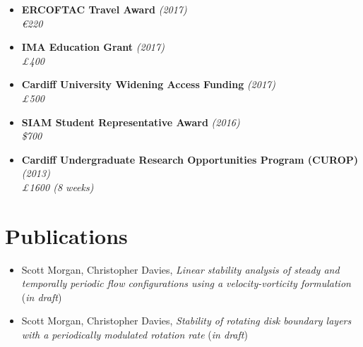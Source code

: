 \documentclass[10pt,a4paper,sans]{moderncv}        %
\begin{document}
\begin{itemize}
			\item \textbf{ERCOFTAC Travel Award} \hfill\textit{(2017)}\\
			\textit{\euro{}220}
			
			\vspace{2pt}
			
			\item \textbf{IMA Education Grant} \hfill\textit{(2017)}\\
			\textit{£400}
			
			\vspace{2pt}
			
			\item \textbf{Cardiff University Widening Access Funding} \hfill\textit{(2017)}\\
			\textit{£500}
			
			\vspace{2pt}
			
			\item \textbf{SIAM Student Representative Award} \hfill \textit{(2016)}\\
			\textit{\$700}
			
			\vspace{2pt}
			
			\item \textbf{Cardiff Undergraduate Research Opportunities Program (CUROP)} \hfill\textit{(2013)} \\
			\textit{£1600 (8 weeks)}
			
		\end{itemize}
	
	\section{Publications}
	
	\vspace{6pt}
	
	\begin{itemize}
		\item Scott Morgan, Christopher Davies, \textit{Linear stability analysis of steady and temporally periodic flow configurations using a velocity-vorticity formulation} (\textit{in draft})
		
		\vspace{6pt}
		
		\item Scott Morgan, Christopher Davies, \textit{Stability of rotating disk boundary layers with a periodically modulated rotation rate} (\textit{in draft})
	\end{itemize}
	
\end{document}

